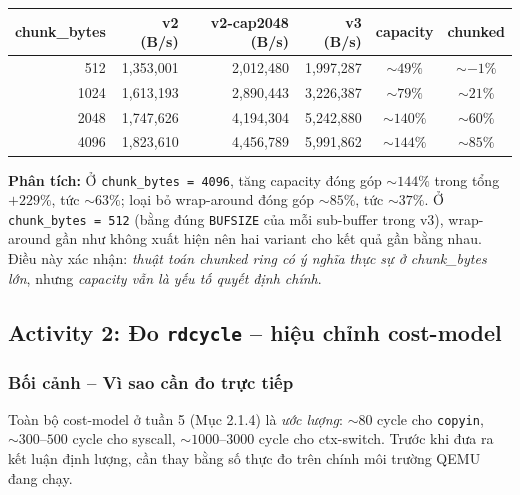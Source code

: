 \documentclass[11pt,a4paper]{article}
\begin{document}
\begin{center}
\begin{tabular}{rrrrcc}
\toprule
\textbf{chunk\_bytes} & \textbf{v2 (B/s)} & \textbf{v2-cap2048 (B/s)} & \textbf{v3 (B/s)} & \textbf{capacity} & \textbf{chunked} \\
\midrule
512  & 1{,}353{,}001 & 2{,}012{,}480 & 1{,}997{,}287 & $\sim 49\%$ & $\sim -1\%$ \\
1024 & 1{,}613{,}193 & 2{,}890{,}443 & 3{,}226{,}387 & $\sim 79\%$ & $\sim 21\%$ \\
2048 & 1{,}747{,}626 & 4{,}194{,}304 & 5{,}242{,}880 & $\sim 140\%$ & $\sim 60\%$ \\
4096 & 1{,}823{,}610 & 4{,}456{,}789 & 5{,}991{,}862 & $\sim 144\%$ & $\sim 85\%$ \\
\bottomrule
\end{tabular}
\end{center}

\textbf{Phân tích:} Ở \texttt{chunk\_bytes = 4096}, tăng capacity đóng góp $\sim 144\%$ trong tổng $+229\%$, tức $\sim 63\%$; loại bỏ wrap-around đóng góp $\sim 85\%$, tức $\sim 37\%$. Ở \texttt{chunk\_bytes = 512} (bằng đúng \texttt{BUFSIZE} của mỗi sub-buffer trong v3), wrap-around gần như không xuất hiện nên hai variant cho kết quả gần bằng nhau. Điều này xác nhận: \emph{thuật toán chunked ring có ý nghĩa thực sự ở chunk\_bytes lớn}, nhưng \emph{capacity vẫn là yếu tố quyết định chính}.

\subsection{Activity 2: Đo \texttt{rdcycle} -- hiệu chỉnh cost-model}

\subsubsection{Bối cảnh -- Vì sao cần đo trực tiếp}

Toàn bộ cost-model ở tuần 5 (Mục 2.1.4) là \emph{ước lượng}: $\sim 80$ cycle cho \texttt{copyin}, $\sim 300$--$500$ cycle cho syscall, $\sim 1000$--$3000$ cycle cho ctx-switch. Trước khi đưa ra kết luận định lượng, cần thay bằng số thực đo trên chính môi trường QEMU đang chạy.
\end{document}
